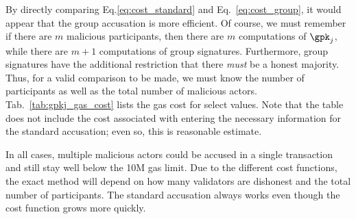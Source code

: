 By directly comparing Eq.\eqref{eq:cost_standard} and
Eq.~\eqref{eq:cost_group}, it would appear that the group accusation
is more efficient.
Of course, we must remember if there are $m$ malicious participants,
then there are $m$ computations of $\gpk_{j}$,
while there are $m+1$ computations of group signatures.
Furthermore, group signatures have the additional restriction that
there \emph{must} be a honest majority.
Thus, for a valid comparison to be made, we must know the
number of participants as well as the total number of malicious actors.
Tab.~\ref{tab:gpkj_gas_cost} lists the gas cost for select values.
Note that the table does not include the cost associated
with entering the necessary information for the standard accusation;
even so, this is reasonable estimate.



In all cases, multiple malicious actors could be accused
in a single transaction and still stay well below the 10M gas limit.
Due to the different cost functions, the exact method will depend
on how many validators are dishonest and the total number of participants.
The standard accusation always works even though the cost function
grows more quickly.



